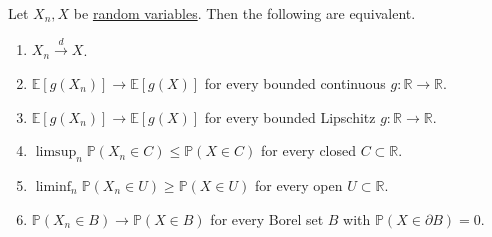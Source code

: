   \begin{theorem}
    \label{thm:portmanteau-theorem}
    Let $X_n, X$ be \hyperref[def:random-variable]{random variables}. Then the following are equivalent.
    \begin{enumerate}
      \item $X_n \xrightarrow{d} X$.
      \item $\mathbb{E}[g(X_n)] \to \mathbb{E}[g(X)]$ for every bounded continuous $g: \mathbb{R} \to \mathbb{R}$.
      \item $\mathbb{E}[g(X_n)] \to \mathbb{E}[g(X)]$ for every bounded Lipschitz $g: \mathbb{R} \to \mathbb{R}$.
      \item $\limsup_{n} \mathbb{P}(X_n \in C) \leq \mathbb{P}(X \in C)$ for every closed $C \subset \mathbb{R}$.
      \item $\liminf_{n} \mathbb{P}(X_n \in U) \geq \mathbb{P}(X \in U)$ for every open $U \subset \mathbb{R}$.
      \item $\mathbb{P}(X_n \in B) \to \mathbb{P}(X \in B)$ for every Borel set $B$ with $\mathbb{P}(X \in \partial B) = 0$.
    \end{enumerate}
  \end{theorem}
